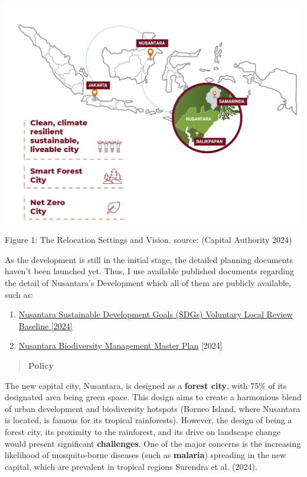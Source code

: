 \documentclass[
  letterpaper,
  DIV=11,
  numbers=noendperiod]{scrreprt}
\providecommand{\tightlist}{%
  \setlength{\itemsep}{0pt}\setlength{\parskip}{0pt}}\usepackage{longtable,booktabs,array}
\begin{document}
\includegraphics[width=6.07292in,height=\textheight]{images/clipboard-3462147358.png}

Figure 1: The Relocation Settings and Vision. source: (Capital Authority
2024)

As the development is still in the initial stage, the detailed planning
documents haven't been launched yet. Thus, I use available published
documents regarding the detail of Nusantara's Development which all of
them are publicly available, such as:

\begin{enumerate}
\def\labelenumi{\arabic{enumi}.}
\tightlist
\item
  \href{https://www.ikn.go.id/storage/pedoman-nusantara/2/nusantara-vlr-baseline-en.pdf}{Nusantara
  Sustainable Development Goals (SDGs) Voluntary Local Review Baseline
  {[}2024{]}}
\item
  \href{https://ikn.go.id/storage/pedoman-nusantara/1/nusantara-biodiversity-management-master-plan-2024.pdf}{Nusantara
  Biodiversity Management Master Plan} {[}2024{]}
\end{enumerate}

\begin{quote}
\textbf{Policy}
\end{quote}

The new capital city, Nusantara, is designed as a \textbf{forest city},
with 75\% of its designated area being green space. This design aims to
create a harmonious blend of urban development and biodiversity hotspots
(Borneo Island, where Nusantara is located, is famous for its tropical
rainforests). However, the design of being a forest city, its proximity
to the rainforest, and its drive on landscape change would present
significant \textbf{challenges}. One of the major concerns is the
increasing likelihood of mosquito-borne diseases (such as
\textbf{malaria}) spreading in the new capital, which are prevalent in
tropical regions Surendra et al. (2024).
\end{document}
